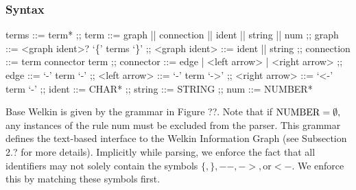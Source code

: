 \subsubsection*{Syntax}
\begin{bnfgrammar}
	terms ::= term* ;;
	term ::= graph || connection || ident || string || num ;;
	graph ::= <graph ident>? `\{' terms `\}' ;;
	<graph ident> ::= ident || string ;;
	connection ::= term connector term ;;
	connector ::= edge | <left arrow> | <right arrow> ;;
	edge ::= `-' term `-' ;;
	<left arrow> ::= `-' term `->' ;;
	<right arrow> ::= `<-' term `-' ;;
	ident ::= CHAR* ;;
	string ::= STRING ;;
	num ::= NUMBER*
\end{bnfgrammar}


Base Welkin is given by the grammar in Figure ??. Note that if $\mathrm{NUMBER}= \emptyset,$ any instances of the rule num must be excluded from the parser. This grammar defines the text-based interface to the Welkin Information Graph (see Subsection 2.? for more details). Implicitly while parsing, we enforce the fact that all identifiers may not solely contain the symbols $\{, \}, --, ->, \text{or} <-.$ We enforce this by matching these symbols first.


